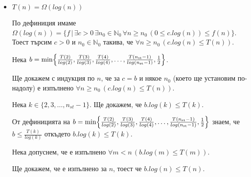 \begin{solution}
\begin{itemize}
		\vspace{0.35cm}
		\item $T(n)=\Omega(log(n))$
		
		По $\hyperref[bdef-asymp-classes]{\text{дефиниция}}$ имаме $\Omega(log(n))=\{f\,|\,\exists c>0\,\exists n_0\in\mathbb{N}_0\,\forall n\ge n_0\,(0\le c.log(n))\le f(n)\}$. Тоест търсим $c>0$ и $n_0\in\mathbb{N}_0$ такива, че $\forall n\ge n_0\,(c.log(n)\le T(n))$.
		
		Нека $b=\min\Bigl\{\frac{T(2)}{log(2)},\frac{T(3)}{log(3)},\frac{T(4)}{log(4)},\dots,\frac{T(n_{\text{st}}-1)}{log({n_{\text{st}}-1)}},\frac12\Bigr\}$.%
		
		Ще докажем с индукция по $n$, че за $c=b$ и някое $n_0$ (което ще установим по-надолу) е изпълнено $\forall n\ge n_0\,(c.log(n)\le T(n))$.
		
		\begin{base}
			Нека $k\in\{2,3,\dots,n_{st}-1\}$. Ще докажем, че $b.log(k)\le T(k)$.
			
			От дефиницията на $b=\min\Bigl\{\frac{T(2)}{log(2)},\frac{T(3)}{log(3)},\frac{T(4)}{log(4)},\dots,\frac{T(n_{\text{st}}-1)}{log({n_{\text{st}}-1)}},\frac12\Bigr\}$ знаем, че $b\le \frac{T(k)}{log(k)}$ откъдето $b.log(k)\le T(k)$.
		\end{base}
		
		\begin{indhypothesis}
			Нека допуснем, че е изпълнено $\forall m<n\,(b.log(m)\le T(m))$.
		\end{indhypothesis}
		
		\begin{indstep}
			Ще докажем, че е изпълнено за $n$, тоест че $b.log(n)\le T(n)$.
			

\end{indstep}
\end{itemize}
\end{solution}
